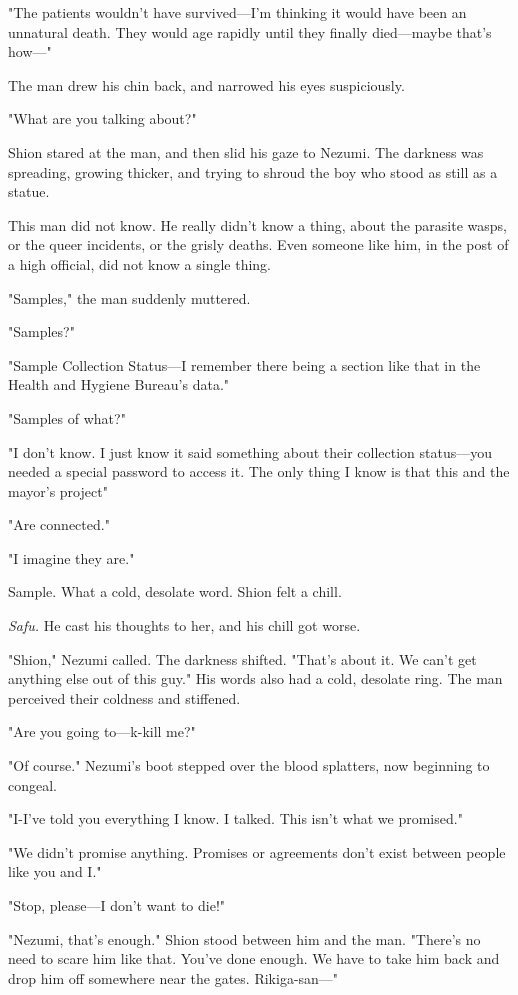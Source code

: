 "The patients wouldn't have survived---I'm thinking it would have been an
unnatural death. They would age rapidly until they finally died---maybe
that's how---"

The man drew his chin back, and narrowed his eyes suspiciously.

"What are you talking about?"

Shion stared at the man, and then slid his gaze to Nezumi. The darkness
was spreading, growing thicker, and trying to shroud the boy who stood
as still as a statue.

This man did not know. He really didn't know a thing, about the parasite
wasps, or the queer incidents, or the grisly deaths. Even someone like
him, in the post of a high official, did not know a single thing.

"Samples," the man suddenly muttered.

"Samples?"

"Sample Collection Status---I remember there being a section like that in
the Health and Hygiene Bureau's data."

\mybreak

"Samples of what?"

"I don't know. I just know it said something about their collection
status---you needed a special password to access it. The only thing I know
is that this and the mayor's project\el "

"Are connected."

"I imagine they are."

Sample. What a cold, desolate word. Shion felt a chill.

\emph{Safu.} He cast his thoughts to her, and his chill got worse.

"Shion," Nezumi called. The darkness shifted. "That's about it. We can't
get anything else out of this guy." His words also had a cold, desolate
ring. The man perceived their coldness and stiffened.

"Are you going to---k-kill me?"

"Of course." Nezumi's boot stepped over the blood splatters, now
beginning to congeal.

"I-I've told you everything I know. I talked. This isn't what we
promised."

"We didn't promise anything. Promises or agreements don't exist between
people like you and I."

"Stop, please---I don't want to die!"

"Nezumi, that's enough." Shion stood between him and the man. "There's
no need to scare him like that. You've done enough. We have to take him
back and drop him off somewhere near the gates. Rikiga-san---"

